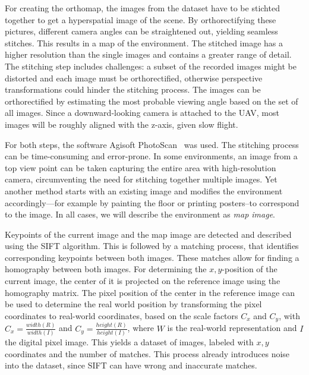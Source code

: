 For creating the orthomap, the images from the dataset have to be stichted
together to get a hyperspatial image of the scene. By orthorectifying
these pictures, different camera angles can be straightened out,
yielding seamless stitches. This results in a map of the
environment. The stitched image has a higher resolution than the
single images and contains a greater range of detail. The stitching
step includes challenges: a subset of the recorded images might be
distorted and each image must be orthorectified, otherwise perspective
transformations could hinder the stitching process. The images can be
orthorectified by estimating the most probable viewing angle based on
the set of all images. Since a downward-looking camera is attached to
the UAV, most images will be roughly aligned with the z-axis, given
slow flight.

For both steps, the software Agisoft
PhotoScan~\cite{agisoft2013agisoft} was used. The stitching process
can be time-consuming and error-prone. In some environments, an image
from a top view point can be taken capturing the entire area with
high-resolution camera, circumventing the need for stitching together
multiple images. Yet another method starts with an existing image and
modifies the environment accordingly---for example by painting the
floor or printing posters--to correspond to the image. In all cases,
we will describe the environment as \emph{map image}. 

Keypoints of the current image and the map image are detected and
described using the SIFT algorithm. This is followed by a matching
process, that identifies corresponding keypoints between both
images. These matches allow for finding a homography between both
images. For determining the $x, y$-position of the current image, the
center of it is projected on the reference image using the homography
matrix. The pixel position of the center in the reference image can be
used to determine the real world position by transforming the pixel
coordinates to real-world coordinates, based on the scale factors
$C_x$ and $C_y$, with $C_x = \frac{width(R)}{width(I)}$ and
$C_y = \frac{height(R)}{height(I)}$, where $W$ is the real-world
representation and $I$ the digital pixel image. This yields a dataset
of images, labeled with $x, y$ coordinates and the number of
matches. This process already introduces noise into the dataset, since
SIFT can have wrong and inaccurate matches.